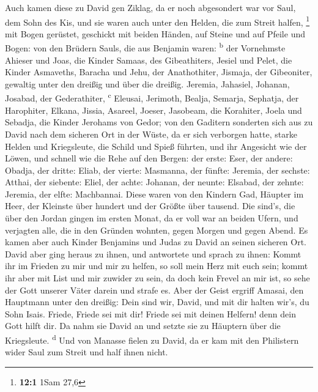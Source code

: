  Auch kamen diese zu David gen Ziklag, da er noch
abgesondert war vor Saul, dem Sohn des Kis, und sie waren auch unter den
Helden, die zum Streit halfen, \footnote{\textbf{12:1} 1Sam 27,6}
 mit Bogen gerüstet, geschickt mit beiden Händen, auf
Steine und auf Pfeile und Bogen: von den Brüdern Sauls, die aus Benjamin
waren: \textsuperscript{b}  der Vornehmste Ahieser und
Joas, die Kinder Samaas, des Gibeathiters, Jesiel und Pelet, die Kinder
Asmaveths, Baracha und Jehu, der Anathothiter,  Jismaja,
der Gibeoniter, gewaltig unter den dreißig und über die dreißig.
 Jeremia, Jahasiel, Johanan, Josabad, der Gederathiter,
\textsuperscript{c}  Eleusai, Jerimoth, Bealja, Semarja,
Sephatja, der Harophiter,  Elkana, Jissia, Asareel,
Joeser, Jasobeam, die Korahiter,  Joela und Sebadja, die
Kinder Jerohams von Gedor;  von den Gaditern sonderten
sich aus zu David nach dem sicheren Ort in der Wüste, da er sich
verborgen hatte, starke Helden und Kriegsleute, die Schild und Spieß
führten, und ihr Angesicht wie der Löwen, und schnell wie die Rehe auf
den Bergen:  der erste: Eser, der andere: Obadja, der
dritte: Eliab,  der vierte: Masmanna, der fünfte:
Jeremia,  der sechste: Atthai, der siebente: Eliel,
 der achte: Johanan, der neunte: Elsabad, 
der zehnte: Jeremia, der elfte: Machbannai.  Diese waren
von den Kindern Gad, Häupter im Heer, der Kleinste über hundert und der
Größte über tausend.  Die sind's, die über den Jordan
gingen im ersten Monat, da er voll war an beiden Ufern, und verjagten
alle, die in den Gründen wohnten, gegen Morgen und gegen Abend.
 Es kamen aber auch Kinder Benjamins und Judas zu David
an seinen sicheren Ort.  David aber ging heraus zu ihnen,
und antwortete und sprach zu ihnen: Kommt ihr im Frieden zu mir und mir
zu helfen, so soll mein Herz mit euch sein; kommt ihr aber mit List und
mir zuwider zu sein, da doch kein Frevel an mir ist, so sehe der Gott
unserer Väter darein und strafe es.  Aber der Geist
ergriff Amasai, den Hauptmann unter den dreißig: Dein sind wir, David,
und mit dir halten wir's, du Sohn Isais. Friede, Friede sei mit dir!
Friede sei mit deinen Helfern! denn dein Gott hilft dir. Da nahm sie
David an und setzte sie zu Häuptern über die Kriegsleute.
\textsuperscript{d}  Und von Manasse fielen zu David, da
er kam mit den Philistern wider Saul zum Streit und half ihnen nicht.
